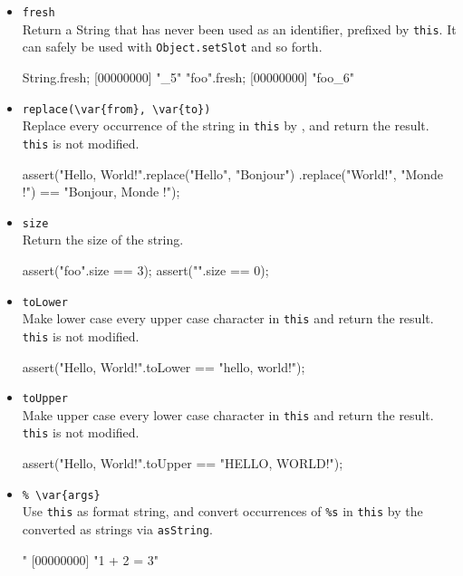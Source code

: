 \begin{itemize}
\item \lstinline|fresh|\\
  Return a String that has never been used as an identifier, prefixed
  by \lstinline|this|.  It can safely be used with
  \lstinline|Object.setSlot| and so forth.
\begin{urbiscript}
String.fresh;
[00000000] "_5"
"foo".fresh;
[00000000] "foo_6"
\end{urbiscript}

\item \lstinline|replace(\var{from}, \var{to})|\\
  Replace every occurrence of the string  in
  \lstinline|this| by , and return the result.
  \lstinline|this| is not modified.
\begin{urbiscript}
assert("Hello, World!".replace("Hello", "Bonjour")
                      .replace("World!", "Monde !")
       == "Bonjour, Monde !");
\end{urbiscript}

\item \lstinline|size|\\
  Return the size of the string.
\begin{urbiscript}
assert("foo".size == 3);
assert("".size == 0);
\end{urbiscript}

\item \lstinline|toLower|\\
  Make lower case every upper case character in \lstinline|this| and
  return the result.  \lstinline|this| is not modified.
\begin{urbiscript}
assert("Hello, World!".toLower == "hello, world!");
\end{urbiscript}

\item \lstinline|toUpper|\\
  Make upper case every lower case character in \lstinline|this| and
  return the result.  \lstinline|this| is not modified.
\begin{urbiscript}
assert("Hello, World!".toUpper == "HELLO, WORLD!");
\end{urbiscript}

\item \lstinline|% \var{args}|\\
  Use \lstinline|this| as format string, and convert occurrences of
  \lstinline|%s| in \lstinline|this| by the  converted as
  strings via \lstinline|asString|.
\begin{urbiscript}
"%
[00000000] "1 + 2 = 3"
\end{urbiscript}


\end{itemize}
